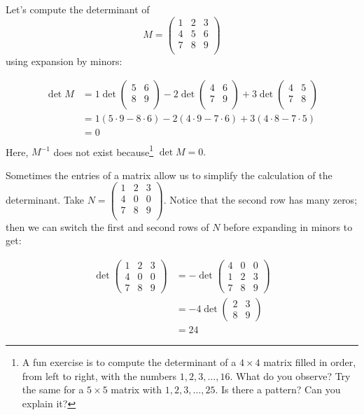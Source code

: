 \begin{example}
Let's compute the determinant of 
\[M=\begin{pmatrix}
1 & 2 & 3 \\
4 & 5 & 6 \\
7 & 8 & 9 \\
\end{pmatrix}\] using expansion by minors:

\begin{align*}
\det M & = 1\det \begin{pmatrix}
5 & 6 \\
8 & 9 \\
\end{pmatrix}
-2 \det \begin{pmatrix}
4 & 6 \\
7 & 9 \\
\end{pmatrix}
+3 \det \begin{pmatrix}
4 & 5 \\
7 & 8 \\
\end{pmatrix} \\
& = 1(5\cdot 9- 8\cdot 6) -2 (4\cdot 9- 7\cdot 6) + 3 (4\cdot 8- 7\cdot 5) \\[1mm]
& = 0 \\
\end{align*}
Here, $M^{-1}$ does not exist because\footnote{A fun exercise is to compute the determinant of a $4\times 4$ matrix filled in order, from left to right,  with the numbers $1,2,3,\ldots, 16$. What do you observe? Try the same for a $5\times 5$ matrix with $1,2,3,\ldots, 25$. Is there a pattern? Can you explain it?} $\det M=0.$
\end{example}


\begin{example}
Sometimes the entries of a matrix allow us to simplify the calculation of the determinant.  Take $N= \begin{pmatrix}
1 & 2 & 3 \\
4 & 0 & 0 \\
7 & 8 & 9 \\
\end{pmatrix}$.  Notice that the second row has many zeros; then we can switch the first and second rows of $N$ before expanding in minors to get:

\begin{align*}
\det \begin{pmatrix}
1 & 2 & 3 \\
4 & 0 & 0 \\
7 & 8 & 9 
\end{pmatrix}
& = -\det \begin{pmatrix}
4 & 0 & 0 \\
1 & 2 & 3 \\
7 & 8 & 9
\end{pmatrix}\\
&= -4 \det \begin{pmatrix}
2 & 3 \\
8 & 9 
\end{pmatrix} \\
&= 24
\end{align*}
\end{example}
 
